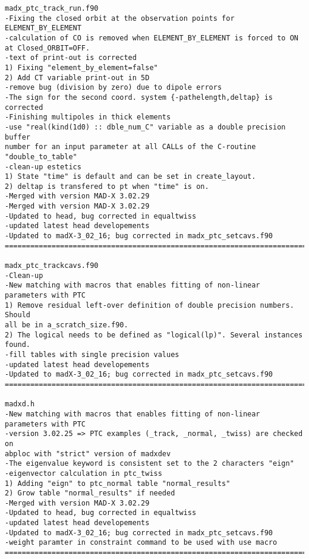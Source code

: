 \begin{verbatim}
madx_ptc_track_run.f90
-Fixing the closed orbit at the observation points for ELEMENT_BY_ELEMENT
-calculation of CO is removed when ELEMENT_BY_ELEMENT is forced to ON
at Closed_ORBIT=OFF.
-text of print-out is corrected
1) Fixing "element_by_element=false"
2) Add CT variable print-out in 5D
-remove bug (division by zero) due to dipole errors
-The sign for the second coord. system {-pathelength,deltap} is corrected
-Finishing multipoles in thick elements
-use "real(kind(1d0) :: dble_num_C" variable as a double precision buffer
number for an input parameter at all CALLs of the C-routine "double_to_table"
-clean-up estetics
1) State "time" is default and can be set in create_layout.
2) deltap is transfered to pt when "time" is on.
-Merged with version MAD-X 3.02.29
-Merged with version MAD-X 3.02.29
-Updated to head, bug corrected in equaltwiss
-updated latest head developements
-Updated to madX-3_02_16; bug corrected in madx_ptc_setcavs.f90
=============================================================================

madx_ptc_trackcavs.f90
-Clean-up
-New matching with macros that enables fitting of non-linear parameters with PTC
1) Remove residual left-over definition of double precision numbers. Should
all be in a_scratch_size.f90.
2) The logical needs to be defined as "logical(lp)". Several instances found.
-fill tables with single precision values
-updated latest head developements
-Updated to madX-3_02_16; bug corrected in madx_ptc_setcavs.f90
=============================================================================

madxd.h
-New matching with macros that enables fitting of non-linear parameters with PTC
-version 3.02.25 => PTC examples (_track, _normal, _twiss) are checked on
abploc with "strict" version of madxdev
-The eigenvalue keyword is consistent set to the 2 characters "eign"
-eigenvector calculation in ptc_twiss
1) Adding "eign" to ptc_normal table "normal_results"
2) Grow table "normal_results" if needed
-Merged with version MAD-X 3.02.29
-Updated to head, bug corrected in equaltwiss
-updated latest head developements
-Updated to madX-3_02_16; bug corrected in madx_ptc_setcavs.f90
-weight paramter in constraint command to be used with use macro
=============================================================================


\end{verbatim}
